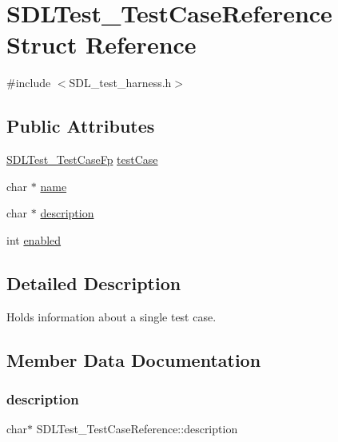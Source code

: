 \hypertarget{struct_s_d_l_test___test_case_reference}{}\section{S\+D\+L\+Test\+\_\+\+Test\+Case\+Reference Struct Reference}
\label{struct_s_d_l_test___test_case_reference}


{\ttfamily \#include $<$S\+D\+L\+\_\+test\+\_\+harness.\+h$>$}

\subsection*{Public Attributes}
\begin{DoxyCompactItemize}
\item 
\hyperlink{_s_d_l__test__harness_8h_ae1a62d8f725d57dc95faddcc5409afbb}{S\+D\+L\+Test\+\_\+\+Test\+Case\+Fp} \hyperlink{struct_s_d_l_test___test_case_reference_af9472f0c421a2845b540fc28fb30a3ef}{test\+Case}
\item 
char $\ast$ \hyperlink{struct_s_d_l_test___test_case_reference_aabd588c915c52fb13bcd0c71e071a604}{name}
\item 
char $\ast$ \hyperlink{struct_s_d_l_test___test_case_reference_a1ee6c8a2529fdfcd62bb1483c26be67d}{description}
\item 
int \hyperlink{struct_s_d_l_test___test_case_reference_a15168c85e38cae7557b4beb477ef6f9a}{enabled}
\end{DoxyCompactItemize}


\subsection{Detailed Description}
Holds information about a single test case. 

\subsection{Member Data Documentation}
\mbox{\label{struct_s_d_l_test___test_case_reference_a1ee6c8a2529fdfcd62bb1483c26be67d}} 
\subsubsection{\texorpdfstring{description}{description}}
{\footnotesize\ttfamily char$\ast$ S\+D\+L\+Test\+\_\+\+Test\+Case\+Reference\+::description}

